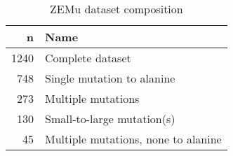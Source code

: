 \begin{table}
  \begin{tabular}{rl}
\toprule
    n &                                 Name \\
\midrule
 1240 &                     Complete dataset \\
  748 &           Single mutation to alanine \\
  273 &                   Multiple mutations \\
  130 &           Small-to-large mutation(s) \\
   45 &  Multiple mutations, none to alanine \\
\bottomrule
\end{tabular}

  \caption[]{ZEMu dataset composition} \label{tab:table-composition}
\end{table}
